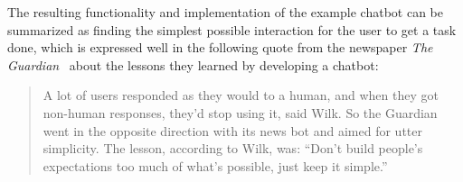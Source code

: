 The resulting functionality and implementation of the example chatbot can be summarized as finding the simplest possible interaction for the user to get a task done, which is expressed well in the following quote from the newspaper \emph{The Guardian}~\cite{digiday} about the lessons they learned by developing a chatbot:

\begin{quote}
A lot of users responded as they would to a human, and when they got non-human responses, they’d stop using it, said Wilk. So the Guardian went in the opposite direction with its news bot and aimed for utter simplicity. The lesson, according to Wilk, was: “Don’t build people’s expectations too much of what’s possible, just keep it simple.”
\end{quote}
